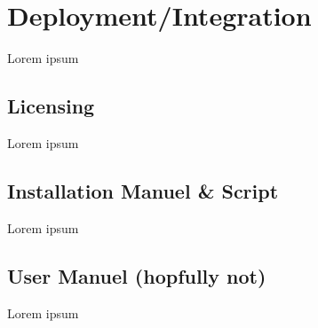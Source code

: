 \section{Deployment/Integration}
Lorem ipsum

\subsection{Licensing}
Lorem ipsum

\subsection{Installation Manuel \& Script}
Lorem ipsum

\subsection{User Manuel (hopfully not)}
Lorem ipsum


